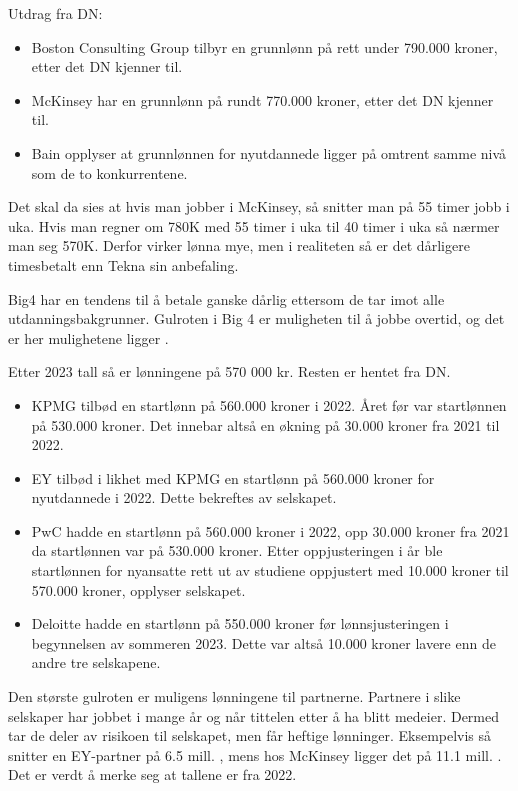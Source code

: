 \begin{outline}
    Utdrag fra DN:
    \begin{itemize}
        \item Boston Consulting Group tilbyr en grunnlønn på rett under 790.000 kroner, etter det DN kjenner til.
        \item McKinsey har en grunnlønn på rundt 770.000 kroner, etter det DN kjenner til.
        \item Bain opplyser at grunnlønnen for nyutdannede ligger på omtrent samme nivå som de to konkurrentene.
    \end{itemize}
\end{outline}

Det skal da sies at hvis man jobber i McKinsey, så snitter man på 55 timer jobb i uka. Hvis man regner om 780K med 55 timer i uka til 40 timer i uka så nærmer man seg 570K. Derfor virker lønna mye, men i realiteten så er det dårligere timesbetalt enn Tekna sin anbefaling. 

Big4 har en tendens til å betale ganske dårlig ettersom de tar imot alle utdanningsbakgrunner. Gulroten i Big 4 er muligheten til å jobbe overtid, og det er her mulighetene ligger \cite{dn_nyutdannede_konsulenter_2024}.

\begin{outline}
    Etter 2023 tall så er lønningene på 570 000 kr. Resten er hentet fra DN.
    \begin{itemize}
        \item KPMG tilbød en startlønn på 560.000 kroner i 2022. Året før var startlønnen på 530.000 kroner. Det innebar altså en økning på 30.000 kroner fra 2021 til 2022. 
        \item EY tilbød i likhet med KPMG en startlønn på 560.000 kroner for nyutdannede i 2022. Dette bekreftes av selskapet.
        \item PwC hadde en startlønn på 560.000 kroner i 2022, opp 30.000 kroner fra 2021 da startlønnen var på 530.000 kroner. Etter oppjusteringen i år ble startlønnen for nyansatte rett ut av studiene oppjustert med 10.000 kroner til 570.000 kroner, opplyser selskapet.
        \item Deloitte hadde en startlønn på 550.000 kroner før lønnsjusteringen i begynnelsen av sommeren 2023. Dette var altså 10.000 kroner lavere enn de andre tre selskapene.
    \end{itemize}
\end{outline}

Den største gulroten er muligens lønningene til partnerne. Partnere i slike selskaper har jobbet i mange år og når tittelen etter å ha blitt medeier. Dermed tar de deler av risikoen til selskapet, men får heftige lønninger. Eksempelvis så snitter en EY-partner på 6.5 mill. \cite{e24_partner_big4}, mens hos McKinsey ligger det på 11.1 mill. \cite{e24_consulting_partner_mbb}. Det er verdt å merke seg at tallene er fra 2022. 



